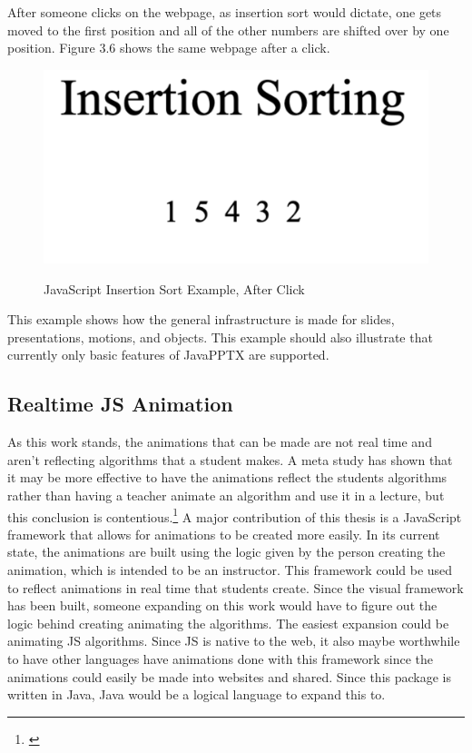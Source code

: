 \documentclass[12pt,twoside]{reedthesis}
\begin{document}
After someone clicks on the webpage, as insertion sort would dictate, one gets moved to the first position and all of the other numbers are shifted over by one position. Figure 3.6 shows the same webpage after a click. 
\begin{figure}[htbp] 
\begin{centering} 
\caption{JavaScript Insertion Sort Example, After Click} 
\includegraphics[scale=0.7]{insafter} 
\label{subd}
\end{centering} 
\end{figure}
This example shows how the general infrastructure is made for slides, presentations, motions, and objects. This example should also illustrate that currently only basic features of JavaPPTX are supported. 


\subsection{Realtime JS Animation}
As this work stands, the animations that can be made are not real time and aren't reflecting algorithms that a student makes. A meta study has shown that it may be more effective to have the animations reflect the students algorithms rather than having a teacher animate an algorithm and use it in a lecture, but this conclusion is contentious.\footnote{\cite{hundhausen_meta-study_2002}} A major contribution of this thesis is a JavaScript framework that allows for animations to be created more easily. In its current state, the animations are built using the logic given by the person creating the animation, which is intended to be an instructor. This framework could be used to reflect animations in real time that students create. Since the visual framework has been built, someone expanding on this work would have to figure out the logic behind creating animating the algorithms. The easiest expansion could be animating JS algorithms. Since JS is native to the web, it also maybe worthwhile to have other languages have animations done with this framework since the animations could easily be made into websites and shared. Since this package is written in Java, Java would be a logical language to expand this to. 
\end{document}
